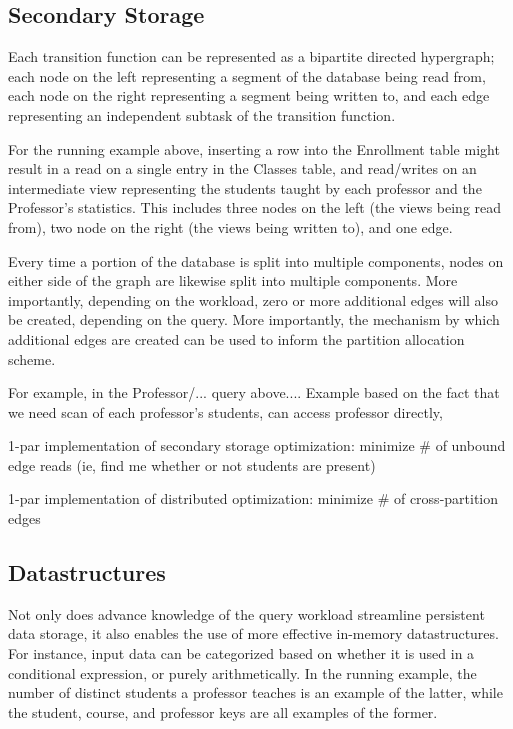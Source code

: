 \subsection{Secondary Storage}
Each transition function can be represented as a bipartite directed hypergraph; each node on the left representing a segment of the database being read from, each node on the right representing a segment being written to, and each edge representing an independent subtask of the transition function.

For the running example above, inserting a row into the Enrollment table might result in a read on a single entry in the Classes table, and read/writes on an intermediate view representing the students taught by each professor and the Professor's statistics.  This includes three nodes on the left (the views being read from), two node on the right (the views being written to), and one edge.

Every time a portion of the database is split into multiple components, nodes on either side of the graph are likewise split into multiple components.  More importantly, depending on the workload, zero or more additional edges will also be created, depending on the query.  More importantly, the mechanism by which additional edges are created can be used to inform the partition allocation scheme.  

For example, in the Professor/... query above....  Example based on the fact that we need scan of each professor's students, can access professor directly, 

1-par implementation of secondary storage optimization: minimize \# of unbound
edge reads (ie, find me whether or not students are present)

1-par implementation of distributed optimization: minimize \# of cross-partition
edges

\subsection{Datastructures}
Not only does advance knowledge of the query workload streamline persistent data storage, it also enables the use of more effective in-memory datastructures.  For instance, input data can be categorized based on whether it is used in a conditional expression, or purely arithmetically.  In the running example, the number of distinct students a professor teaches is an example of the latter, while the student, course, and professor keys are all examples of the former.

